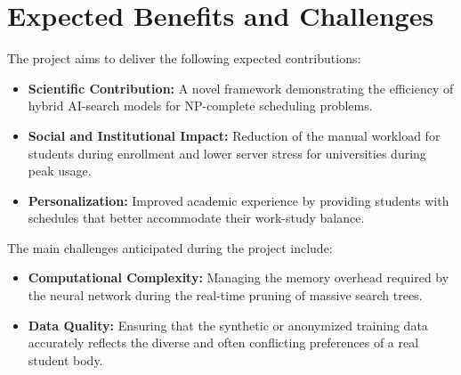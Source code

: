 
\section{Expected Benefits and Challenges}
The project aims to deliver the following expected contributions:
\begin{itemize}
    \item \textbf{Scientific Contribution:} A novel framework demonstrating the efficiency of hybrid AI-search models for NP-complete scheduling problems.
    \item \textbf{Social and Institutional Impact:} Reduction of the manual workload for students during enrollment and lower server stress for universities during peak usage.
    \item \textbf{Personalization:} Improved academic experience by providing students with schedules that better accommodate their work-study balance.
\end{itemize}

The main challenges anticipated during the project include:
\begin{itemize}
    \item \textbf{Computational Complexity:} Managing the memory overhead required by the neural network during the real-time pruning of massive search trees.
    \item \textbf{Data Quality:} Ensuring that the synthetic or anonymized training data accurately reflects the diverse and often conflicting preferences of a real student body.
\end{itemize}
